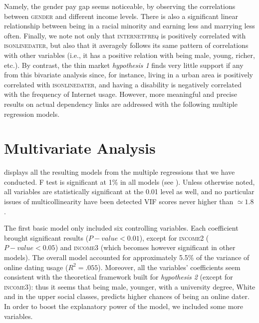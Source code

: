 Namely, the gender pay gap seems noticeable, by observing the correlations
between \textsc{gender} and different income levels. There is also
a significant linear relationship between being in a racial minority
and earning less and marrying less often. Finally, we note not only
that \textsc{internetfreq} is positively correlated with \textsc{isonlinedater},
but also that it averagely follows its same pattern of correlations
with other variables (i.e., it has a positive relation with being
male, young, richer, etc.). By contrast, the thin market \textsl{hypothesis
1} finds very little support \textendash{} if any \textendash{} from
this bivariate analysis since, for instance, living in a urban area
is positively correlated with \textsc{isonlinedater}, and having a
disability is negatively correlated with the frequency of Internet
usage. However, more meaningful and precise results on actual dependency
links are addressed with the following multiple regression models.


\section{Multivariate Analysis}

 displays all the resulting models from
the multiple regressions that we have conducted. F test is significant
at 1\% in all models (see ). Unless otherwise
noted, all variables are statistically significant at the 0.01 level
as well, and no particular issues of multicollinearity have been detected
\textendash{} VIF scores never higher than $\simeq1.8$.

The first basic model only included six controlling variables. Each
coefficient brought significant results ($P-value<0.01$), except
for \textsc{income2} ($P-value<0.05$) and \textsc{income3} (which
becomes however significant in other models). The overall model accounted
for approximately 5.5\% of the variance of online dating usage ($R^{2}=.055$).
Moreover, all the variables\textquoteright{} coefficients seem consistent
with the theoretical framework built for \textsl{hypothesis 2} (except
for \textsc{income3}): thus it seems that being male, younger, with
a university degree, White and in the upper social classes, predicts
higher chances of being an online dater. In order to boost the explanatory
power of the model, we included some more variables.

